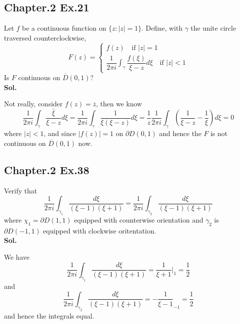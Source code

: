 \documentclass[lang=en,11pt,a4paper,citestyle =authoryear]{elegantpaper}
\begin{document}
\subsection*{Chapter.2 Ex.21} 
Let $f$ be a continuous function on $\{z:|z|=1\}$. Define, with $\gamma$ the unite circle traversed counterclockwise,
\[F(z) = \begin{cases}f(z)\quad\text{if }|z|=1 \\ \dfrac{1}{2\pi i}\int_{\gamma}\dfrac{f(\xi)}{\xi-z}d\xi\quad\text{if }|z|<1\end{cases}\]
Is $F$ continuous on $\overline{D}(0,1)$?
\vspace{0.5em}\\
\textbf{Sol.} \par
Not really, consider $f(z) = \overline{z}$, then we know
\[
\dfrac{1}{2\pi i}\int_{\gamma}\dfrac{\bar{\xi}}{\xi-z}d\xi = \dfrac{1}{2\pi i}\int_{\gamma}\dfrac{1}{\xi(\xi-z)}d\xi = \dfrac{1}{z}\dfrac{1}{2\pi i}\int_{\gamma}(\dfrac{1}{\xi-z}-\dfrac{1}{\xi})d\xi = 0
\]
where $|z|<1$, and since $|f(z)| = 1$ on $\partial D(0,1)$ and hence the $F$ is not continuous on $\overline{D}(0,1)$ now.
\vspace{0.5em}


\subsection*{Chapter.2 Ex.38} 
Verify that
\[
\dfrac{1}{2\pi i}\int_{\gamma_1} \dfrac{d\xi}{(\xi-1)(\xi+1)} = \dfrac{1}{2\pi i}\int_{\gamma_2} \dfrac{d\xi}{(\xi-1)(\xi+1)} 
\]
where $\chi_1 = \partial D(1,1)$ equipped with counterwise orientation and $\gamma_2$ is $\partial D(-1,1)$ equipped with clockwise oritentation.
\vspace{0.5em}\\
\textbf{Sol.} \par
We have
\[
\dfrac{1}{2\pi i}\int_{\gamma_1} \dfrac{d\xi}{(\xi-1)(\xi+1)} = \dfrac{1}{\xi+1}|_{1} = \dfrac{1}{2}
\]
and
\[\dfrac{1}{2\pi i}\int_{\gamma_2} \dfrac{d\xi}{(\xi-1)(\xi+1)} = - \dfrac{1}{\xi-1}_{-1} = \dfrac{1}{2}\]
and hence the integrals equal.
\vspace{0.5em}


\addappheadtotoc
\end{document}
